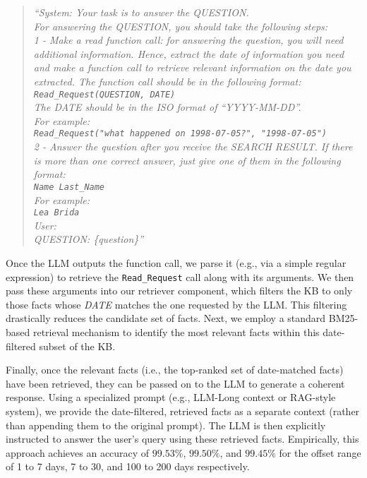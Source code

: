 \documentclass[11pt]{article}
\begin{document}
\begin{quote}
\emph{``System: Your task is to answer the QUESTION.\\
For answering the QUESTION, you should take the following steps:\\
1 - Make a read function call: for answering the question, you will need additional information. Hence, extract the date of information you need and make a function call to retrieve relevant information on the date you extracted. The function call should be in the following format:\\
\texttt{Read\_Request(QUESTION, DATE)}\\
The DATE should be in the ISO format of ``YYYY-MM-DD''.\\
For example:\\
\texttt{Read\_Request("what happened on 1998-07-05?", "1998-07-05")}\\
2 - Answer the question after you receive the SEARCH RESULT.
If there is more than one correct answer, 
just give one of
them in the following format:\\
\texttt{Name Last\_Name}\\
For example:\\
\texttt{Lea Brida}\\
User:\\
QUESTION: \{question\}''} \\
\end{quote}

Once the LLM outputs the function call, we parse it (e.g.,
via a simple regular expression) to retrieve
the \texttt{Read\_Request} call along with its arguments. We
then pass these arguments into our retriever component,
which filters the KB to only those facts whose \textit{DATE}
matches the one requested by the LLM. This filtering
drastically reduces the candidate set of facts. Next, we
employ a standard BM25-based retrieval mechanism to identify
the most relevant facts within this date-filtered subset of
the KB.

Finally, once the relevant facts (i.e., the top-ranked set
of date-matched facts) have been retrieved, they can be
passed on to the LLM to generate a coherent response. Using
a specialized prompt (e.g., LLM-Long context or RAG-style
system), we provide the date-filtered, retrieved facts as a
separate context (rather than appending them to the original
prompt). The LLM is then explicitly instructed to answer the
user’s query using these retrieved facts. Empirically, this
approach achieves an accuracy of $99.53\%$, $99.50\%$, and
$99.45\%$ for the offset range of 1 to 7 days, 7 to 30, and
100 to 200 days respectively.
\end{document}

